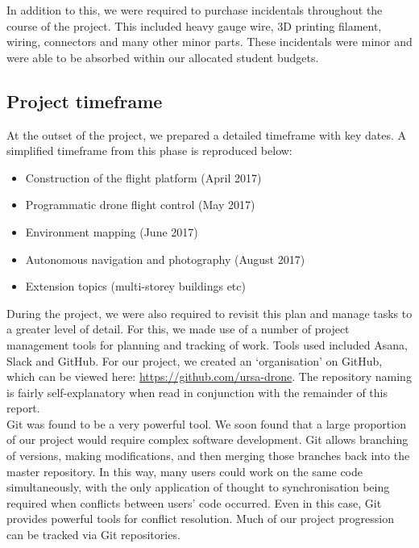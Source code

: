 \documentclass[capstone_report.tex]{subfiles}
\begin{document}
In addition to this, we were required to purchase incidentals throughout the course of the project. This included heavy gauge wire, 3D printing filament, wiring, connectors and many other minor parts. These incidentals were minor and were able to be absorbed within our allocated student budgets.

\subsection{Project timeframe}
At the outset of the project, we prepared a detailed timeframe with key dates. A simplified timeframe from this phase is reproduced below:

\begin{itemize}
\item Construction of the flight platform (April 2017)
\item Programmatic drone flight control (May 2017)
\item Environment mapping (June 2017)
\item Autonomous navigation and photography (August 2017)
\item Extension topics (multi-storey buildings etc) 
\end{itemize}

During the project, we were also required to revisit this plan and manage tasks to a greater level of detail. For this, we made use of a number of project management tools for planning and tracking of work. Tools used included Asana, Slack and GitHub. For our project, we created an `organisation' on GitHub, which can be viewed here: \url{https://github.com/ursa-drone}. The repository naming is fairly self-explanatory when read in conjunction with the remainder of this report. \\

Git was found to be a very powerful tool. We soon found that a large proportion of our project would require complex software development. Git allows branching of versions, making modifications, and then merging those branches back into the master repository. In this way, many users could work on the same code simultaneously, with the only application of thought to synchronisation being required when conflicts between users' code occurred. Even in this case, Git provides powerful tools for conflict resolution. Much of our project progression can be tracked via Git repositories.
\end{document}
